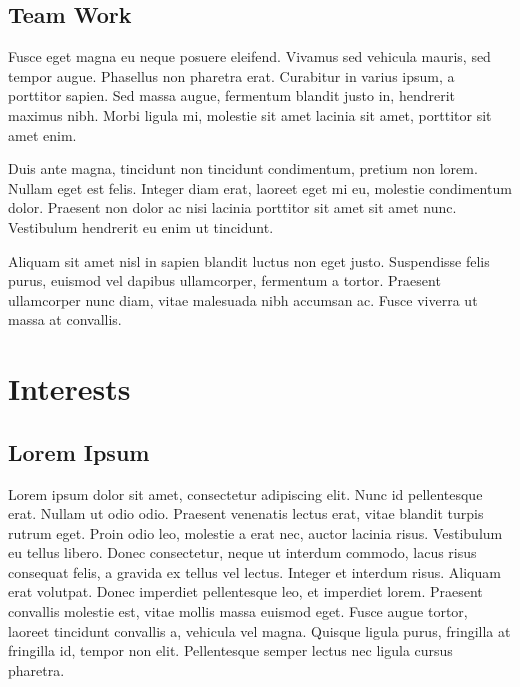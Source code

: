 \documentclass[10pt]{../bil-CV}
\begin{document}
\subsectionrule

\subsection{Team Work}
\begin{compactlist}
	\item{Fusce eget magna eu neque posuere eleifend. Vivamus sed vehicula mauris, sed tempor augue. Phasellus non pharetra erat. Curabitur in varius ipsum, a porttitor sapien. Sed massa augue, fermentum blandit justo in, hendrerit maximus nibh. Morbi ligula mi, molestie sit amet lacinia sit amet, porttitor sit amet enim.}
	\item{Duis ante magna, tincidunt non tincidunt condimentum, pretium non lorem. Nullam eget est felis. Integer diam erat, laoreet eget mi eu, molestie condimentum dolor. Praesent non dolor ac nisi lacinia porttitor sit amet sit amet nunc. Vestibulum hendrerit eu enim ut tincidunt.}
	\item{Aliquam sit amet nisl in sapien blandit luctus non eget justo. Suspendisse felis purus, euismod vel dapibus ullamcorper, fermentum a tortor. Praesent ullamcorper nunc diam, vitae malesuada nibh accumsan ac. Fusce viverra ut massa at convallis.}
\end{compactlist}



\section{Interests}
\subsection{Lorem Ipsum}

Lorem ipsum dolor sit amet, consectetur adipiscing elit. Nunc id pellentesque erat. Nullam ut odio odio. Praesent venenatis lectus erat, vitae blandit turpis rutrum eget. Proin odio leo, molestie a erat nec, auctor lacinia risus. Vestibulum eu tellus libero. Donec consectetur, neque ut interdum commodo, lacus risus consequat felis, a gravida ex tellus vel lectus. Integer et interdum risus. Aliquam erat volutpat.
\littleblankline
Donec imperdiet pellentesque leo, et imperdiet lorem. Praesent convallis molestie est, vitae mollis massa euismod eget. Fusce augue tortor, laoreet tincidunt convallis a, vehicula vel magna. Quisque ligula purus, fringilla at fringilla id, tempor non elit. Pellentesque semper lectus nec ligula cursus pharetra.
\end{document}
